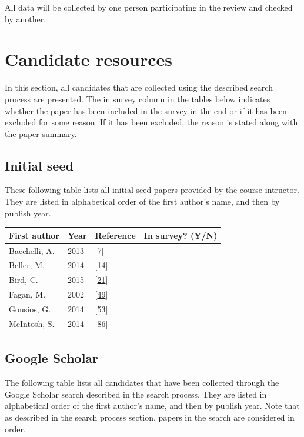 \documentclass[]{book}
\begin{document}
All data will be collected by one person participating in the review and
checked by another.

\section{Candidate resources}\label{candidate-resources}

In this section, all candidates that are collected using the described
search process are presented. The in survey column in the tables below
indicates whether the paper has been included in the survey in the end
or if it has been excluded for some reason. If it has been excluded, the
reason is stated along with the paper summary.

\subsection{Initial seed}\label{initial-seed-1}

These following table lists all initial seed papers provided by the
course intructor. They are listed in alphabetical order of the first
author's name, and then by publish year.

\begin{longtable}[]{@{}llll@{}}
\toprule
First author & Year & Reference & In survey? (Y/N)\tabularnewline
\midrule
\endhead
Bacchelli, A. & 2013 &
{[}\protect\hyperlink{ref-bacchelli2013expectations}{7}{]}
&\tabularnewline
Beller, M. & 2014 & {[}\protect\hyperlink{ref-beller2014modern}{14}{]}
&\tabularnewline
Bird, C. & 2015 & {[}\protect\hyperlink{ref-bird2015lessons}{21}{]}
&\tabularnewline
Fagan, M. & 2002 & {[}\protect\hyperlink{ref-fagan2002design}{49}{]}
&\tabularnewline
Gousios, G. & 2014 &
{[}\protect\hyperlink{ref-gousios2014exploratory}{53}{]}
&\tabularnewline
McIntosh, S. & 2014 &
{[}\protect\hyperlink{ref-mcintosh2014impact}{86}{]} &\tabularnewline
\bottomrule
\end{longtable}

\subsection{Google Scholar}\label{google-scholar}

The following table lists all candidates that have been collected
through the Google Scholar search described in the search process. They
are listed in alphabetical order of the first author's name, and then by
publish year. Note that as described in the search process section,
papers in the search are considered in order.
\end{document}
